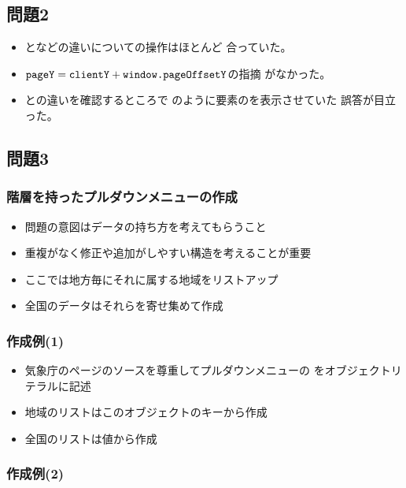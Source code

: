  \subsection{問題2}
  \begin{frame}[containsverbatim]
   \begin{itemize}
    \item {}となどの違いについての操作はほとんど
          合っていた。
		\item $\texttt{pageY}=\texttt{clientY}+\texttt{window.pageOffsetY}$の指摘
					がなかった。
    \item {}との違いを確認するところで
          のように要素のを表示させていた
          誤答が目立った。
   \end{itemize}
  \end{frame}
  \subsection{問題3}
  \begin{frame}[containsverbatim]
   \frametitle{階層を持ったプルダウンメニューの作成}
   \begin{itemize}
    \item 問題の意図はデータの持ち方を考えてもらうこと
    \item 重複がなく修正や追加がしやすい構造を考えることが重要
    \item ここでは地方毎にそれに属する地域をリストアップ
    \item 全国のデータはそれらを寄せ集めて作成
   \end{itemize}
  \end{frame}
  \begin{frame}[containsverbatim]
   \frametitle{作成例(1)}
   \begin{itemize}
    \item 気象庁のページのソースを尊重してプルダウンメニューの
          をオブジェクトリテラルに記述
    \item 地域のリストはこのオブジェクトのキーから作成
    \item 全国のリストは値から作成
   \end{itemize}
  \end{frame}
  \begin{frame}[containsverbatim]
   \frametitle{作成例(2)}
  \end{frame}
